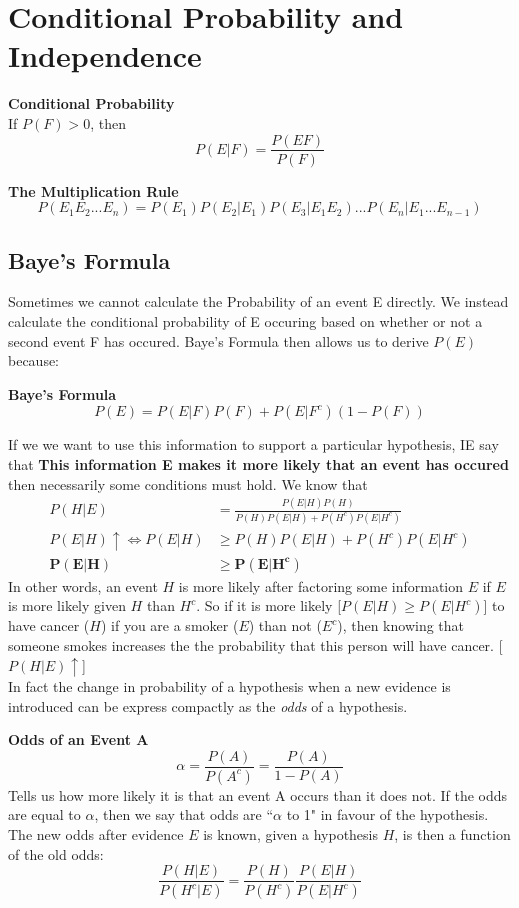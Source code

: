 \documentclass[10pt,a4paper]{article}
\begin{document}
    \section{Conditional Probability and Independence}
    \begin{framed}
        \centering\textbf{Conditional Probability} \\
        If $P(F) > 0$, then $$P(E|F) = \frac{P(EF)}{P(F)}$$
    \end{framed}
    \begin{framed}
        \centering\textbf{The Multiplication Rule}
        $$P(E_1 E_2 ... E_n) = P(E_1)P(E_2 | E_1)P(E_3|E_1E_2)...P(E_n|E_1...E_{n-1})$$
    \end{framed}
    \subsection{Baye's Formula}
    Sometimes we cannot calculate the Probability of an event E directly. We instead calculate the conditional probability of E occuring based on whether or not a second event F has occured. Baye's Formula then allows us to derive $P(E)$ because:
    \begin{framed}
        \centering\textbf{Baye's Formula}
        $$P(E) = P(E|F)P(F) + P(E|F^c)(1-P(F))$$
    \end{framed}
\noindent If we we want to use this information to support a particular hypothesis, IE say that \textbf{This information E makes it more likely that an event has occured} then necessarily some conditions must hold. We know that 
    \begin{align*}
        P(H|E) &   = \frac{P(E|H)P(H)}{P(H)P(E|H) + P(H^c)P(E|H^c)} \\
        P(E|H)\uparrow \iff P(E|H) &\geq P(H)P(E|H) + P(H^c)P(E|H^c) \\
        \bm{P(E|H)} &\bm{\geq P(E|H^c)}
    \end{align*}
    In other words, an event $H$ is more likely after factoring some information $E$ if $E$ is more likely given $H$ than $H^c$. So if it is more likely [$P(E|H) \geq P(E|H^c)$] to have cancer ($H$) if you are a smoker ($E$) than not ($E^c$), then knowing that someone smokes increases the the probability that this person will have cancer. [$P(H|E) \uparrow$] \\
    In fact the change in probability of a hypothesis when a new evidence is introduced can be express compactly as the \emph{odds} of a hypothesis.
    \begin{framed}
        \centering\textbf{Odds of an Event A}
        $$\alpha = \frac{P(A)}{P(A^c)} = \frac{P(A)}{1-P(A)} $$
        Tells us how more likely it is that an event A occurs than it does not. If the odds are equal to $\alpha$, then we say that odds are ``$\alpha$ to 1" in favour of the hypothesis. \\
        The new odds after evidence $E$ is known, given a hypothesis $H$, is then a function of the old odds: 
        $$\frac{P(H|E)}{P(H^c|E)} = \frac{P(H)}{P(H^c)}\frac{P(E|H)}{P(E|H^c)}$$
    \end{framed}
    \newpage
\end{document}
